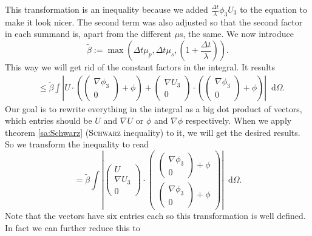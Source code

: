 \documentclass[12pt,a4paper,twoside, open=right]{scrreprt}
\theoremstyle{definition}
\theoremstyle{plain}
\newcommand{\abs}[1]{\left\vert #1\right\vert}
\newcommand{\D}{\mathop{}\!\mathrm{d}}
\begin{document}
This transformation is an inequality because we added $\frac{\Delta t}{\lambda}\phi_3U_3$ to the equation to make it look nicer. The second term was also adjusted so that the second factor in each summand is, apart from the different $\mu$s, the same. We now introduce 
\begin{equation}
    \tilde\beta:=\max\left(\Delta t\mu_p,\Delta t\mu_s,\left(1+\frac{\Delta t}{\lambda}\right)\right).
\end{equation}
This way we will get rid of the constant factors in the integral. It results
\begin{align}
&\le \tilde\beta\int \abs{U\cdot\left(\begin{pmatrix}
\nabla\phi_3\\0
\end{pmatrix}+\phi\right)+\begin{pmatrix}
\nabla U_3\\0
\end{pmatrix}\cdot\left(\begin{pmatrix}
\nabla\phi_3\\0
\end{pmatrix}+\phi\right)}\D\Omega.
\end{align}
Our goal is to rewrite everything in the integral as a big dot product of vectors, which entries should be $U$ and $\nabla U$ or $\phi$ and $\nabla \phi$ respectively. When we apply theorem \ref{sa:Schwarz} (\textsc{Schwarz} inequality) to it, we will get the desired results. So we transform the inequality to read
\begin{equation}
    = \tilde\beta\int\abs{\begin{pmatrix}
        U\\ \nabla U_3\\0
        \end{pmatrix}\cdot\begin{pmatrix}
        \begin{pmatrix}
        \nabla\phi_3\\0\end{pmatrix}+\phi
        \\\begin{pmatrix}
        \nabla\phi_3\\0\end{pmatrix}+\phi
        \end{pmatrix}}\D\Omega.
\end{equation}
Note that the vectors have six entries each so this transformation is well defined. In fact we can further reduce this to
\end{document}
